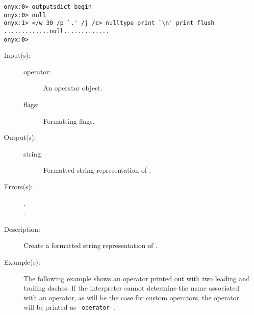 \begin{description}
\begin{description}
\begin{verbatim}
onyx:0> outputsdict begin
onyx:0> null
onyx:1> </w 30 /p `.' /j /c> nulltype print `\n' print flush
.............null.............
onyx:0>
		\end{verbatim}
	\end{description}
\label{outputsdict:operatortype}
\item[{\onyxop{operator flags}{operatortype}{string}}: ]
	\begin{description}\item[]
	\item[Input(s): ]
		\begin{description}\item[]
		\item[operator: ]
			An operator object.
		\item[flags: ]
			Formatting flags.
		\end{description}
	\item[Output(s): ]
		\begin{description}\item[]
		\item[string: ]
			Formatted string representation of .
		\end{description}
	\item[Errors(s): ]
		\begin{description}\item[]
		\item[.]
		\item[.]
		\end{description}
	\item[Description: ]
		Create a formatted string representation of .
	\item[Example(s): ]
		The following example shows an operator printed out with two
		leading and trailing dashes.  If the interpreter cannot
		determine the name associated with an operator, as will be the
		case for custom operators, the operator will be printed as
		{\tt -operator-}.
		\begin{verbatim}


\end{verbatim}
\end{description}
\end{description}
